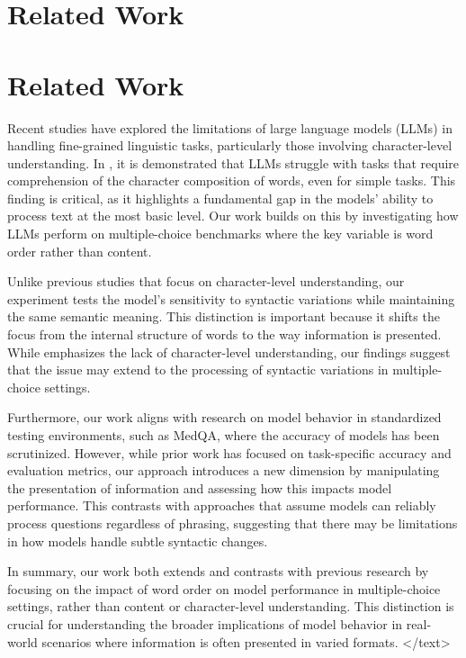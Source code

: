 \documentclass{article}
\begin{document}
\section{Related Work}
\section*{Related Work}

Recent studies have explored the limitations of large language models (LLMs) in handling fine-grained linguistic tasks, particularly those involving character-level understanding. In \cite{2405.11357v3}, it is demonstrated that LLMs struggle with tasks that require comprehension of the character composition of words, even for simple tasks. This finding is critical, as it highlights a fundamental gap in the models' ability to process text at the most basic level. Our work builds on this by investigating how LLMs perform on multiple-choice benchmarks where the key variable is word order rather than content. 

Unlike previous studies that focus on character-level understanding, our experiment tests the model's sensitivity to syntactic variations while maintaining the same semantic meaning. This distinction is important because it shifts the focus from the internal structure of words to the way information is presented. While \cite{2405.11357v3} emphasizes the lack of character-level understanding, our findings suggest that the issue may extend to the processing of syntactic variations in multiple-choice settings. 

Furthermore, our work aligns with research on model behavior in standardized testing environments, such as MedQA, where the accuracy of models has been scrutinized. However, while prior work has focused on task-specific accuracy and evaluation metrics, our approach introduces a new dimension by manipulating the presentation of information and assessing how this impacts model performance. This contrasts with approaches that assume models can reliably process questions regardless of phrasing, suggesting that there may be limitations in how models handle subtle syntactic changes. 

In summary, our work both extends and contrasts with previous research by focusing on the impact of word order on model performance in multiple-choice settings, rather than content or character-level understanding. This distinction is crucial for understanding the broader implications of model behavior in real-world scenarios where information is often presented in varied formats.
</text>
\end{document}
